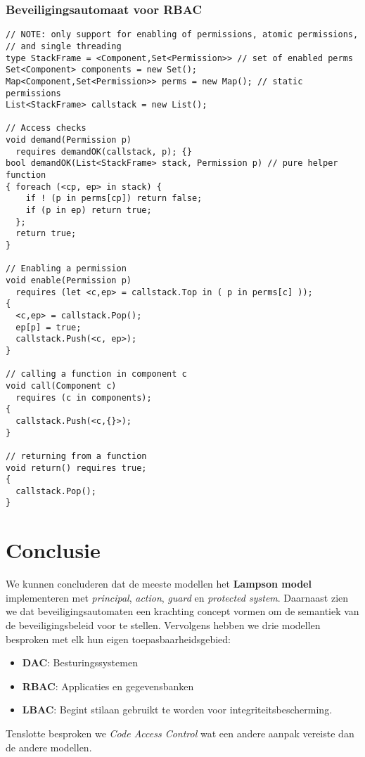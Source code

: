 \documentclass[../main.tex]{subfiles}
\begin{document}
\subsubsection{Beveiligingsautomaat voor RBAC}
\begin{lstlisting}
// NOTE: only support for enabling of permissions, atomic permissions,
// and single threading
type StackFrame = <Component,Set<Permission>> // set of enabled perms
Set<Component> components = new Set();
Map<Component,Set<Permission>> perms = new Map(); // static permissions
List<StackFrame> callstack = new List();

// Access checks
void demand(Permission p)
  requires demandOK(callstack, p); {}
bool demandOK(List<StackFrame> stack, Permission p) // pure helper function
{ foreach (<cp, ep> in stack) {
    if ! (p in perms[cp]) return false;
    if (p in ep) return true;
  };
  return true;
}

// Enabling a permission
void enable(Permission p)
  requires (let <c,ep> = callstack.Top in ( p in perms[c] ));
{
  <c,ep> = callstack.Pop();
  ep[p] = true;
  callstack.Push(<c, ep>);
}

// calling a function in component c
void call(Component c)
  requires (c in components);
{
  callstack.Push(<c,{}>);
}

// returning from a function
void return() requires true;
{
  callstack.Pop();
}
\end{lstlisting}

\section{Conclusie}
We kunnen concluderen dat de meeste modellen het \textbf{Lampson model} implementeren met \textit{principal}, \textit{action}, \textit{guard} en \textit{protected system}. Daarnaast zien we dat beveiligingsautomaten een krachting concept vormen om de semantiek van de beveiligingsbeleid voor te stellen. Vervolgens hebben we drie modellen besproken met elk hun eigen toepasbaarheidsgebied:
\begin{itemize}
	\item \textbf{DAC}: Besturingssystemen
	\item \textbf{RBAC}: Applicaties en gegevensbanken
	\item \textbf{LBAC}: Begint stilaan gebruikt te worden voor integriteitsbescherming.
\end{itemize}
Tenslotte besproken we \textit{Code Access Control} wat een andere aanpak vereiste dan de andere modellen.
\end{document}
